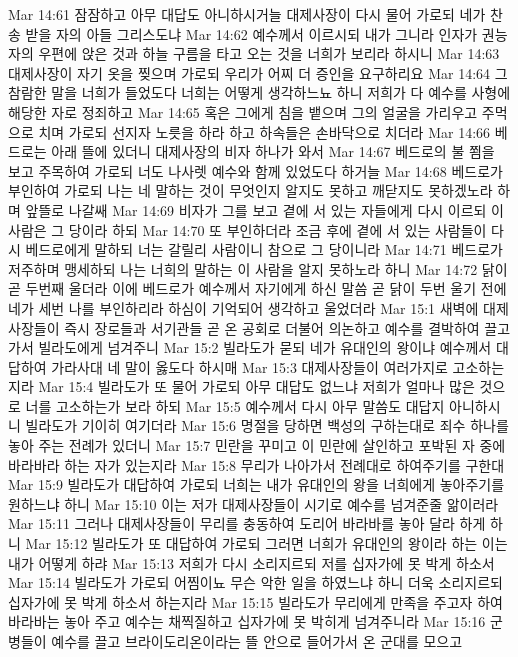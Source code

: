 Mar 14:61  잠잠하고 아무 대답도 아니하시거늘 대제사장이 다시 물어 가로되 네가 찬송 받을 자의 아들 그리스도냐
Mar 14:62  예수께서 이르시되 내가 그니라 인자가 권능자의 우편에 앉은 것과 하늘 구름을 타고 오는 것을 너희가 보리라 하시니
Mar 14:63  대제사장이 자기 옷을 찢으며 가로되 우리가 어찌 더 증인을 요구하리요
Mar 14:64  그 참람한 말을 너희가 들었도다 너희는 어떻게 생각하느뇨 하니 저희가 다 예수를 사형에 해당한 자로 정죄하고
Mar 14:65  혹은 그에게 침을 뱉으며 그의 얼굴을 가리우고 주먹으로 치며 가로되 선지자 노릇을 하라 하고 하속들은 손바닥으로 치더라
Mar 14:66  베드로는 아래 뜰에 있더니 대제사장의 비자 하나가 와서
Mar 14:67  베드로의 불 쬠을 보고 주목하여 가로되 너도 나사렛 예수와 함께 있었도다 하거늘
Mar 14:68  베드로가 부인하여 가로되 나는 네 말하는 것이 무엇인지 알지도 못하고 깨닫지도 못하겠노라 하며 앞뜰로 나갈쌔
Mar 14:69  비자가 그를 보고 곁에 서 있는 자들에게 다시 이르되 이 사람은 그 당이라 하되
Mar 14:70  또 부인하더라 조금 후에 곁에 서 있는 사람들이 다시 베드로에게 말하되 너는 갈릴리 사람이니 참으로 그 당이니라
Mar 14:71  베드로가 저주하며 맹세하되 나는 너희의 말하는 이 사람을 알지 못하노라 하니
Mar 14:72  닭이 곧 두번째 울더라 이에 베드로가 예수께서 자기에게 하신 말씀 곧 닭이 두번 울기 전에 네가 세번 나를 부인하리라 하심이 기억되어 생각하고 울었더라
Mar 15:1  새벽에 대제사장들이 즉시 장로들과 서기관들 곧 온 공회로 더불어 의논하고 예수를 결박하여 끌고 가서 빌라도에게 넘겨주니
Mar 15:2  빌라도가 묻되 네가 유대인의 왕이냐 예수께서 대답하여 가라사대 네 말이 옳도다 하시매
Mar 15:3  대제사장들이 여러가지로 고소하는지라
Mar 15:4  빌라도가 또 물어 가로되 아무 대답도 없느냐 저희가 얼마나 많은 것으로 너를 고소하는가 보라 하되
Mar 15:5  예수께서 다시 아무 말씀도 대답지 아니하시니 빌라도가 기이히 여기더라
Mar 15:6  명절을 당하면 백성의 구하는대로 죄수 하나를 놓아 주는 전례가 있더니
Mar 15:7  민란을 꾸미고 이 민란에 살인하고 포박된 자 중에 바라바라 하는 자가 있는지라
Mar 15:8  무리가 나아가서 전례대로 하여주기를 구한대
Mar 15:9  빌라도가 대답하여 가로되 너희는 내가 유대인의 왕을 너희에게 놓아주기를 원하느냐 하니
Mar 15:10  이는 저가 대제사장들이 시기로 예수를 넘겨준줄 앎이러라
Mar 15:11  그러나 대제사장들이 무리를 충동하여 도리어 바라바를 놓아 달라 하게 하니
Mar 15:12  빌라도가 또 대답하여 가로되 그러면 너희가 유대인의 왕이라 하는 이는 내가 어떻게 하랴
Mar 15:13  저희가 다시 소리지르되 저를 십자가에 못 박게 하소서
Mar 15:14  빌라도가 가로되 어찜이뇨 무슨 악한 일을 하였느냐 하니 더욱 소리지르되 십자가에 못 박게 하소서 하는지라
Mar 15:15  빌라도가 무리에게 만족을 주고자 하여 바라바는 놓아 주고 예수는 채찍질하고 십자가에 못 박히게 넘겨주니라
Mar 15:16  군병들이 예수를 끌고 브라이도리온이라는 뜰 안으로 들어가서 온 군대를 모으고
